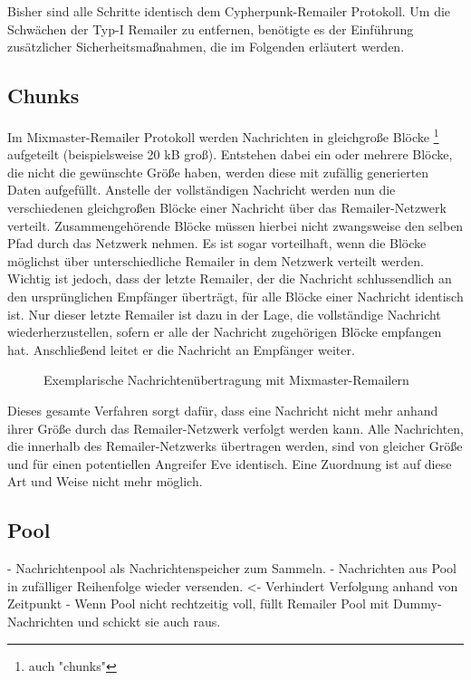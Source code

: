 Bisher sind alle Schritte identisch dem Cypherpunk-Remailer Protokoll. Um die Schwächen der Typ-I Remailer zu entfernen, benötigte es der Einführung zusätzlicher Sicherheitsmaßnahmen, die im Folgenden erläutert werden.

\subsection{Chunks}
Im Mixmaster-Remailer Protokoll werden Nachrichten in gleichgroße Blöcke \footnote{auch "chunks"} aufgeteilt (beispielsweise 20 kB groß). Entstehen dabei ein oder mehrere Blöcke, die nicht die gewünschte Größe haben, werden diese mit zufällig generierten Daten aufgefüllt. Anstelle der vollständigen Nachricht werden nun die verschiedenen gleichgroßen Blöcke einer Nachricht über das Remailer-Netzwerk verteilt. Zusammengehörende Blöcke müssen hierbei nicht zwangsweise den selben Pfad durch das Netzwerk nehmen. Es ist sogar vorteilhaft, wenn die Blöcke möglichst über unterschiedliche Remailer in dem Netzwerk verteilt werden. Wichtig ist jedoch, dass der letzte Remailer, der die Nachricht schlussendlich an den ursprünglichen Empfänger überträgt, für alle Blöcke einer Nachricht identisch ist. Nur dieser letzte Remailer ist dazu in der Lage, die vollständige Nachricht wiederherzustellen, sofern er alle der Nachricht zugehörigen Blöcke empfangen hat. Anschließend leitet er die Nachricht an Empfänger weiter.

\begin{figure}
	\begin{center}
		\def\svgwidth{0.9 \linewidth}
		
		\caption{Exemplarische Nachrichtenübertragung mit Mixmaster-Remailern}
	\end{center}
\end{figure}

Dieses gesamte Verfahren sorgt dafür, dass eine Nachricht nicht mehr anhand ihrer Größe durch das Remailer-Netzwerk verfolgt werden kann. Alle Nachrichten, die innerhalb des Remailer-Netzwerks übertragen werden, sind von gleicher Größe und für einen potentiellen Angreifer Eve identisch. Eine Zuordnung ist auf diese Art und Weise nicht mehr möglich.

\subsection{Pool}
- Nachrichtenpool als Nachrichtenspeicher zum Sammeln.
- Nachrichten aus Pool in zufälliger Reihenfolge wieder versenden. <- Verhindert Verfolgung anhand von Zeitpunkt
- Wenn Pool nicht rechtzeitig voll, füllt Remailer Pool mit Dummy-Nachrichten und schickt sie auch raus.

